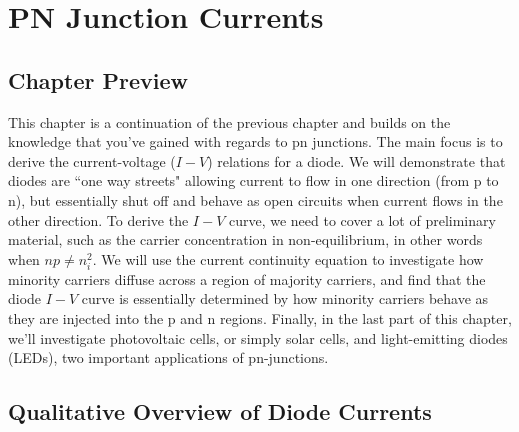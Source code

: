 \chapter{PN Junction Currents}
\label{ch:ch06_pn_currents}
\graphicspath{{./figs_pn_currents/}}
\section{Chapter Preview}
This chapter is a continuation of the previous chapter and builds on the knowledge that you've gained with regards to pn junctions.  The main focus is to derive the current-voltage ($I-V$) relations  for a diode.  We will demonstrate that diodes are ``one way streets" allowing current to flow in one direction (from p to n), but essentially shut off and behave as open circuits when current flows in the other direction.  To derive the $I-V$ curve, we need to cover a lot of preliminary material, such as the carrier concentration in non-equilibrium, in other words when $n p \neq n_i^2$.  We will use the current continuity equation to investigate how minority carriers diffuse across a region of majority carriers, and find that the diode $I-V$ curve is essentially determined by how minority carriers behave as they are injected into the p and n regions.  Finally, in the last part of this chapter, we'll investigate photovoltaic cells, or simply solar cells, and light-emitting diodes (LEDs), two important applications of pn-junctions.
\section{Qualitative Overview of Diode Currents}

